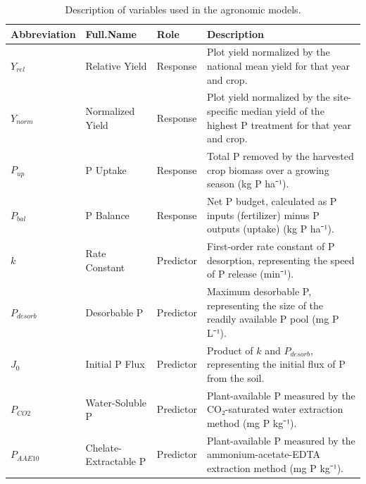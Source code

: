 \documentclass[
  a4paper,
]{article}
\begin{document}
\begin{longtable}[]{@{}
  >{\raggedright\arraybackslash}p{}
  >{\raggedright\arraybackslash}p{}
  >{\raggedright\arraybackslash}p{}
  >{\raggedright\arraybackslash}p{}@{}}

\caption{\label{tbl-variables}Description of variables used in the
agronomic models.}

\tabularnewline

\toprule\noalign{}
\begin{minipage}[b]{\linewidth}\raggedright
Abbreviation
\end{minipage} & \begin{minipage}[b]{\linewidth}\raggedright
Full.Name
\end{minipage} & \begin{minipage}[b]{\linewidth}\raggedright
Role
\end{minipage} & \begin{minipage}[b]{\linewidth}\raggedright
Description
\end{minipage} \\
\midrule\noalign{}
\endhead
\bottomrule\noalign{}
\endlastfoot
\(Y_{rel}\) & Relative Yield & Response & Plot yield normalized by the
national mean yield for that year and crop. \\
\(Y_{norm}\) & Normalized Yield & Response & Plot yield normalized by
the site-specific median yield of the highest P treatment for that year
and crop. \\
\(P_{up}\) & P Uptake & Response & Total P removed by the harvested crop
biomass over a growing season (kg P ha⁻¹). \\
\(P_{bal}\) & P Balance & Response & Net P budget, calculated as P
inputs (fertilizer) minus P outputs (uptake) (kg P ha⁻¹). \\
\(k\) & Rate Constant & Predictor & First-order rate constant of P
desorption, representing the speed of P release (min⁻¹). \\
\(P_{desorb}\) & Desorbable P & Predictor & Maximum desorbable P,
representing the size of the readily available P pool (mg P L⁻¹). \\
\(J_0\) & Initial P Flux & Predictor & Product of \(k\) and
\(P_{desorb}\), representing the initial flux of P from the soil. \\
\(P_{CO2}\) & Water-Soluble P & Predictor & Plant-available P measured
by the CO₂-saturated water extraction method (mg P kg⁻¹). \\
\(P_{AAE10}\) & Chelate-Extractable P & Predictor & Plant-available P
measured by the ammonium-acetate-EDTA extraction method (mg P kg⁻¹). \\

\end{longtable}
\end{document}
